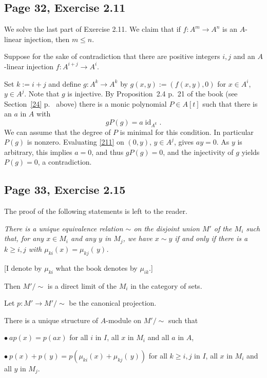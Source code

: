 \documentclass[parskip=half,fontsize=12pt]{scrartcl}%
\newcommand{\oo}{\operatorname}\newcommand{\ooo}{\operatorname*}
\begin{document}
\subsection{Page 32, Exercise 2.11}%

We solve the last part of Exercise 2.11. We claim that if $f:A^m\to A^n$ is an $A$-linear injection, then $m\le n$. 

Suppose for the sake of contradiction that there are positive integers $i,j$ and an $A$-linear injection $f:A^{i+j}\to A^i$. 

Set $k:=i+j$ and define $g:A^k\to A^k$ by $g(x,y):=(f(x,y),0)$ for $x\in A^i$, $y\in A^j$. Note that $g$ is injective. By Proposition~2.4 p.~21 of the book (see Section~\ref{24} p.~\pageref{24} above) there is a monic polynomial $P\in A[t]$ such that there is an $a$ in $A$ with 
\begin{equation}\label{211}
gP(g)=a\oo{id}_{A^k}.
\end{equation} 
We can assume that the degree of $P$ is minimal for this condition. In particular $P(g)$ is nonzero. Evaluating \eqref{211} on $(0,y)$, $y\in A^j$, gives $ay=0$. As $y$ is arbitrary, this implies $a=0$, and thus $gP(g)=0$, and the injectivity of $g$ yields $P(g)=0$, a contradiction.

\subsection{Page 33, Exercise 2.15}%

The proof of the following statements is left to the reader.

\emph{There is a unique equivalence relation $\sim$ on the disjoint union $M'$ of the $M_i$ such that, for any $x\in M_i$ and any $y$ in $M_j$, we have $x\sim y$ if and only if there is a $k\ge i,j$ with $\mu_{ki}(x)=\mu_{kj}(\,y)$.}

[I denote by $\mu_{ki}$ what the book denotes by $\mu_{ik}$.]

Then $M'/\sim$ is a direct limit of the $M_i$ in the category of sets. 

Let $p:M'\to M'/\sim$ be the canonical projection. 

There is a unique structure of $A$-module on $M'/\sim$ such that 

$\bullet\ ap(x)=p(ax)$ for all $i$ in $I$, all $x$ in $M_i$ and all $a$ in $A$, 

$\bullet\ p(x)+p(\,y)=p(\mu_{ki}(x)+\mu_{kj}(\,y))$ for all $k\ge i,j$ in $I$, all $x$ in $M_i$ and all $y$ in $M_j$. 
\end{document}
